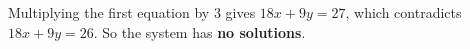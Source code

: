 Multiplying the first equation by $3$ gives $18x+9y=27$, which contradicts $18x+9y=26$. So the system has \textbf{no solutions}.
